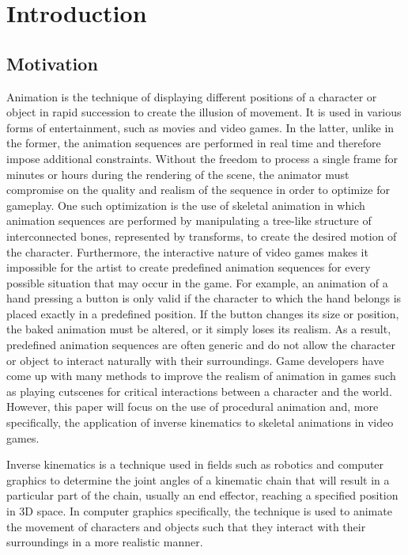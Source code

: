 \chapter{Introduction}
\section{Motivation} 
Animation is the technique of displaying different positions of a character or
object in rapid succession to create the illusion of movement. It is used in
various forms of entertainment, such as movies and video games. In the latter,
unlike in the former, the animation sequences are performed in real time and
therefore impose additional constraints. Without the freedom to process a single
frame for minutes or hours during the rendering of the scene, the animator must
compromise on the quality and realism of the sequence in order to optimize for
gameplay. One such optimization is the use of skeletal animation in which
animation sequences are performed by manipulating a tree-like structure of
interconnected bones, represented by transforms, to create the desired motion of
the character. Furthermore, the interactive nature of video games makes it
impossible for the artist to create predefined animation sequences for every
possible situation that may occur in the game. For example, an animation of
a hand pressing a button is only valid if the character to which the hand
belongs is placed exactly in a predefined position. If the button changes its
size or position, the baked animation must be altered, or it simply loses its
realism. As a result, predefined animation sequences are often generic and
do not allow the character or object to interact naturally with their
surroundings. Game developers have come up with many methods to improve the
realism of animation in games such as playing cutscenes for critical
interactions between a character and the world. However, this paper will focus
on the use of procedural animation and, more specifically, the application of
inverse kinematics to skeletal animations in video games.

Inverse kinematics is a technique used in fields such as robotics and computer
graphics to determine the joint angles of a kinematic chain that will result in
a particular part of the chain, usually an end effector, reaching a specified
position in 3D space. In computer graphics specifically, the technique is used
to animate the movement of characters and objects such that they interact with
their surroundings in a more realistic manner. 

